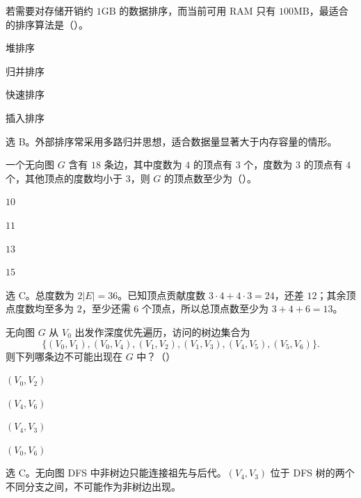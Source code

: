 \begin{question}
若需要对存储开销约 $1\mathrm{GB}$ 的数据排序，而当前可用 RAM 只有 $100\mathrm{MB}$，最适合的排序算法是（\quad）。
\begin{choiceoptions}[2]
  \item 堆排序
  \item 归并排序
  \item 快速排序
  \item 插入排序
\end{choiceoptions}
\begin{solution}
选 B。外部排序常采用多路归并思想，适合数据量显著大于内存容量的情形。
\end{solution}
\end{question}

\begin{question}
一个无向图 $G$ 含有 $18$ 条边，其中度数为 $4$ 的顶点有 $3$ 个，度数为 $3$ 的顶点有 $4$ 个，其他顶点的度数均小于 $3$，则 $G$ 的顶点数至少为（\quad）。
\begin{choiceoptions}[1]
  \item $10$
  \item $11$
  \item $13$
  \item $15$
\end{choiceoptions}
\begin{solution}
选 C。总度数为 $2|E|=36$。已知顶点贡献度数 $3\cdot4+4\cdot3=24$，还差 $12$；其余顶点度数均至多为 $2$，至少还需 $6$ 个顶点，所以总顶点数至少为 $3+4+6=13$。
\end{solution}
\end{question}

\begin{question}
无向图 $G$ 从 $V_0$ 出发作深度优先遍历，访问的树边集合为
\[
\{(V_0,V_1),(V_0,V_4),(V_1,V_2),(V_1,V_3),(V_4,V_5),(V_5,V_6)\}.
\]
则下列哪条边不可能出现在 $G$ 中？（\quad）
\begin{choiceoptions}[2]
  \item $(V_0,V_2)$
  \item $(V_4,V_6)$
  \item $(V_4,V_3)$
  \item $(V_0,V_6)$
\end{choiceoptions}
\begin{solution}
选 C。无向图 DFS 中非树边只能连接祖先与后代。$(V_4,V_3)$ 位于 DFS 树的两个不同分支之间，不可能作为非树边出现。
\end{solution}
\end{question}

